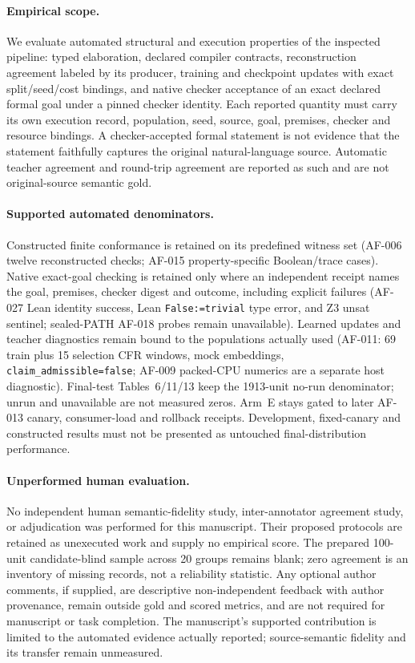 \paragraph{Empirical scope.}
We evaluate automated structural and execution properties of the inspected
pipeline: typed elaboration, declared compiler contracts, reconstruction
agreement labeled by its producer, training and checkpoint updates with exact
split/seed/cost bindings, and native checker acceptance of an exact declared
formal goal under a pinned checker identity. Each reported quantity must carry
its own execution record, population, seed, source, goal, premises, checker and
resource bindings. A checker-accepted formal statement is not evidence that the
statement faithfully captures the original natural-language source. Automatic
teacher agreement and round-trip agreement are reported as such and are not
original-source semantic gold.
\paragraph{Supported automated denominators.}
Constructed finite conformance is retained on its predefined witness set
(AF-006 twelve reconstructed checks; AF-015 property-specific Boolean/trace
cases). Native exact-goal checking is retained only where an independent
receipt names the goal, premises, checker digest and outcome, including
explicit failures (AF-027 Lean identity success, Lean \texttt{False:=trivial}
type error, and Z3 unsat sentinel; sealed-PATH AF-018 probes remain
unavailable). Learned updates and teacher diagnostics remain bound to the
populations actually used (AF-011: 69 train plus 15 selection CFR windows,
mock embeddings, \texttt{claim\_admissible=false}; AF-009 packed-CPU
numerics are a separate host diagnostic). Final-test Tables~6/11/13 keep the
1913-unit no-run denominator; unrun and unavailable are not measured zeros.
Arm~E stays gated to later AF-013 canary, consumer-load and rollback receipts.
Development, fixed-canary and constructed results must not be presented as
untouched final-distribution performance.
\paragraph{Unperformed human evaluation.}
No independent human semantic-fidelity study, inter-annotator agreement study,
or adjudication was performed for this manuscript. Their proposed protocols
are retained as unexecuted work and supply no empirical score. The prepared
100-unit candidate-blind sample across 20 groups remains blank; zero
agreement is an inventory of missing records, not a reliability statistic.
Any optional author comments, if supplied, are descriptive non-independent
feedback with author provenance, remain outside gold and scored metrics, and
are not required for manuscript or task completion. The manuscript's
supported contribution is limited to the automated evidence actually
reported; source-semantic fidelity and its transfer remain unmeasured.
